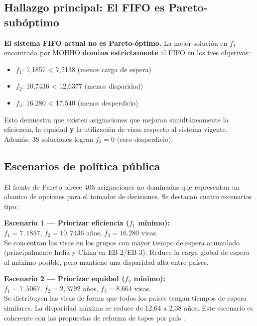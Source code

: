 \documentclass[12pt,letterpaper]{article}
\begin{document}
\subsection{Hallazgo principal: El FIFO es Pareto-subóptimo}

\begin{resultbox}
\textbf{El sistema FIFO actual no es Pareto-óptimo.} La mejor solución en $f_1$ encontrada por MOHHO \textbf{domina estrictamente} al FIFO en los tres objetivos:
\begin{itemize}
    \item $f_1$: 7{,}1857 < 7{,}2138 (menos carga de espera)
    \item $f_2$: 10{,}7436 < 12{,}6377 (menos disparidad)
    \item $f_3$: 16.280 < 17.540 (menos desperdicio)
\end{itemize}
Esto demuestra que existen asignaciones que mejoran simultáneamente la eficiencia, la equidad \textbf{y} la utilización de visas respecto al sistema vigente. Además, 38 soluciones logran $f_3 = 0$ (cero desperdicio).
\end{resultbox}

\subsection{Escenarios de política pública}

El frente de Pareto ofrece 406 asignaciones no dominadas que representan un abanico de opciones para el tomador de decisiones. Se destacan cuatro escenarios tipo:

\begin{examplebox}
\textbf{Escenario 1 --- Priorizar eficiencia ($f_1$ mínimo):}\\
$f_1 = 7{,}1857$, $f_2 = 10{,}7436$ años, $f_3 = 16.280$ visas.\\
Se concentran las visas en los grupos con mayor tiempo de espera acumulado (principalmente India y China en EB-2/EB-3). Reduce la carga global de espera al máximo posible, pero mantiene una disparidad alta entre países.
\end{examplebox}

\begin{examplebox}
\textbf{Escenario 2 --- Priorizar equidad ($f_2$ mínimo):}\\
$f_1 = 7{,}5067$, $f_2 = 2{,}3792$ años, $f_3 = 8.664$ visas.\\
Se distribuyen las visas de forma que todos los países tengan tiempos de espera similares. La disparidad máxima se reduce de 12{,}64 a 2{,}38 años. Este escenario es coherente con las propuestas de reforma de topes por país \parencite{fwd2024}.
\end{examplebox}
\end{document}
